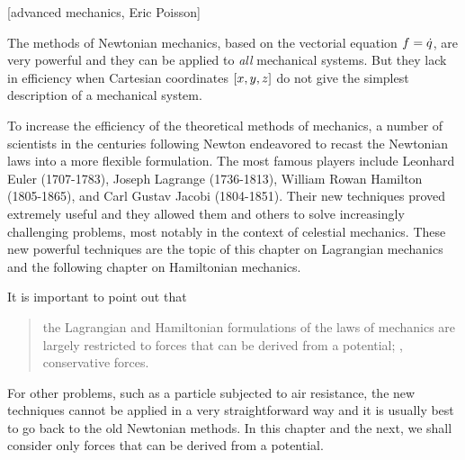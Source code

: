 [advanced mechanics, Eric Poisson]

The methods of Newtonian mechanics, based on the vectorial equation $f = \dot{q}$, are very powerful and they can be applied to \emph{all} mechanical systems. But they lack in efficiency when Cartesian coordinates $\left[{x,y,z}\right]$ do not give the simplest description of a mechanical system.

To increase the efficiency of the theoretical methods of mechanics, a number of scientists in the centuries following Newton endeavored to recast the Newtonian laws into a more flexible formulation. The most famous players include Leonhard Euler (1707-1783), Joseph Lagrange (1736-1813), William Rowan Hamilton (1805-1865), and Carl Gustav Jacobi (1804-1851). Their new techniques proved extremely useful and they allowed them and others to solve increasingly challenging problems, most notably in the context of celestial mechanics. These new powerful techniques are the topic of this chapter on Lagrangian mechanics and the following chapter on Hamiltonian mechanics.

It is important to point out that 
\begin{quote}
the Lagrangian and Hamiltonian formulations of the laws of mechanics are largely restricted to forces that can be derived from a potential; \ie, conservative forces.
\end{quote}
For other problems, such as a particle subjected to air resistance, the new techniques cannot be applied in a very straightforward way and it is usually best to go back to the old Newtonian methods. In this chapter and the next, we shall consider only forces that can be derived from a potential.

